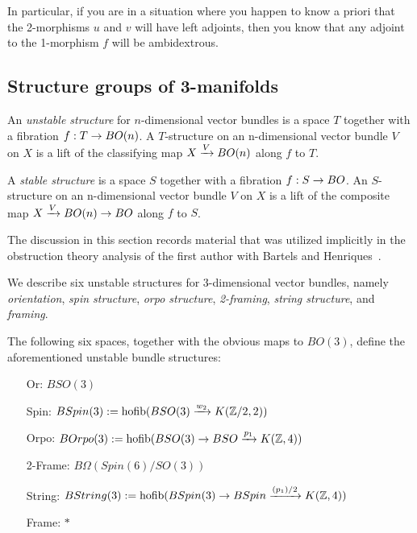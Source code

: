 \documentclass{amsart}
\begin{document}
In particular, if you are in a situation where you happen to know a priori that the 2-morphisms $u$ and $v$ will have left adjoints, then you know that any adjoint to the 1-morphism $f$ will be ambidextrous.  %

\subsection{Structure groups of 3-manifolds} \label{sec-lft-struc}

\begin{definition}
An \emph{unstable structure} for $n$-dimensional vector bundles is a space $T$ together with a fibration $f: T \rightarrow BO(n)$.  A $T$-structure on an n-dimensional vector bundle $V$ on $X$ is a lift of the classifying map $X \xrightarrow{V} BO(n)$ along $f$ to $T$.

A \emph{stable structure} is a space $S$ together with a fibration $f: S \rightarrow BO$.  An $S$-structure on an n-dimensional vector bundle $V$ on $X$ is a lift of the composite map $X \xrightarrow{V} BO(n) \rightarrow BO$ along $f$ to $S$.
\end{definition}

The discussion in this section records material that was utilized implicitly in the obstruction theory analysis of the first author with Bartels and Henriques~\cite{bdh}.


We describe six unstable structures for 3-dimensional vector bundles, namely \emph{orientation}, \emph{spin structure}, \emph{orpo structure}, \emph{2-framing}, \emph{string structure}, and \emph{framing}.

\begin{definition}
The following six spaces, together with the obvious maps to $BO(3)$, define the aforementioned unstable bundle structures:
\begin{itemize}
\item[Or:] $BSO(3)$
\item[Spin:] $BSpin(3) := \operatorname{hofib}(BSO(3) \xrightarrow{w_2} K(\mathbb Z/2,2))$
\item[Orpo:] $BOrpo(3) := \operatorname{hofib}(BSO(3) \rightarrow BSO \xrightarrow{p_1} K(\mathbb Z,4))$
\item[2-Frame:] $B\Omega(Spin(6)/SO(3))$
\item[String:] $BString(3) := \operatorname{hofib}(BSpin(3) \rightarrow BSpin \xrightarrow{(p_1)/2} K(\mathbb Z,4))$
\item[Frame:] $*$
\end{itemize}
\end{definition}
\end{document}
